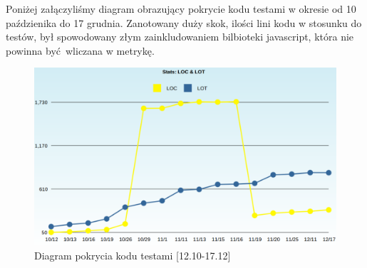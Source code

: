     Poniżej załączyliśmy diagram obrazujący pokrycie kodu testami w okresie od 10 paździenika do 17 grudnia. Zanotowany duży skok, ilości lini kodu w stosunku do testów, był spowodowany złym zainkludowaniem bilbioteki javascript, która nie powinna być wliczana w metrykę.
    \begin{figure}[h]
      \centering
      \includegraphics[scale=0.4]{images/LOC.png}
      \caption{Diagram pokrycia kodu testami [12.10-17.12]}
    \end{figure}
